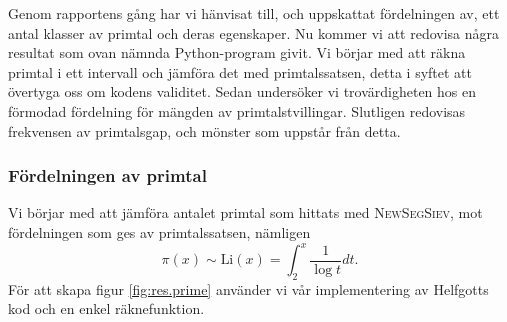 
Genom rapportens gång har vi hänvisat till, och uppskattat fördelningen av, ett antal klasser av primtal och deras egenskaper. 
Nu kommer vi att redovisa några resultat som ovan nämnda Python-program givit.
Vi börjar med att räkna primtal i ett intervall och jämföra det med primtalssatsen, detta i syftet att övertyga oss om kodens validitet. 
Sedan undersöker vi trovärdigheten hos en förmodad fördelning för mängden av primtalstvillingar. 
Slutligen redovisas frekvensen av primtalsgap, och mönster som uppstår från detta.

\subsubsection{Fördelningen av primtal}\label{app.primes.title}

Vi börjar med att jämföra antalet primtal som hittats med \textsc{NewSegSiev}, mot fördelningen som ges av primtalssatsen, nämligen
\begin{equation}
    \pi(x) \sim \text{Li}(x) = \int_2^x\frac{1}{\log t}dt\label{app.primes.PNT}.
\end{equation}
För att skapa figur \ref{fig:res.prime} använder vi vår implementering av Helfgotts kod och en enkel räknefunktion.

